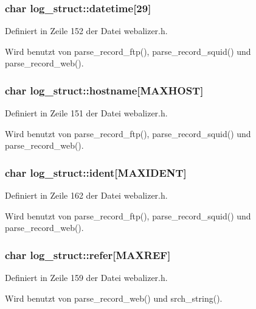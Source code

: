 \subsubsection{\setlength{\rightskip}{0pt plus 5cm}char {\bf log\_\-struct::datetime}[29]}\label{structlog__struct_1a6e77deebf410bb8fefe35aa02e384c}




Definiert in Zeile 152 der Datei webalizer.h.

Wird benutzt von parse\_\-record\_\-ftp(), parse\_\-record\_\-squid() und parse\_\-record\_\-web().
\subsubsection{\setlength{\rightskip}{0pt plus 5cm}char {\bf log\_\-struct::hostname}[MAXHOST]}\label{structlog__struct_8d92ed4a00d2d6b0f155bdbfcc551478}




Definiert in Zeile 151 der Datei webalizer.h.

Wird benutzt von parse\_\-record\_\-ftp(), parse\_\-record\_\-squid() und parse\_\-record\_\-web().
\subsubsection{\setlength{\rightskip}{0pt plus 5cm}char {\bf log\_\-struct::ident}[MAXIDENT]}\label{structlog__struct_abac03796cba2fed0c5185a55e5578bd}




Definiert in Zeile 162 der Datei webalizer.h.

Wird benutzt von parse\_\-record\_\-ftp(), parse\_\-record\_\-squid() und parse\_\-record\_\-web().
\subsubsection{\setlength{\rightskip}{0pt plus 5cm}char {\bf log\_\-struct::refer}[MAXREF]}\label{structlog__struct_cb4f74246c1b97c518bbcc8a4823c0d4}




Definiert in Zeile 159 der Datei webalizer.h.

Wird benutzt von parse\_\-record\_\-web() und srch\_\-string().
